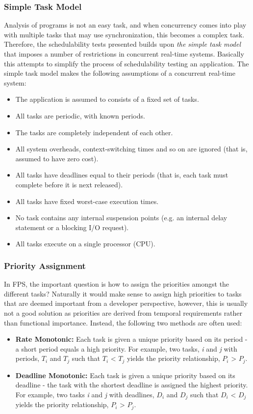\subsubsection{Simple Task Model}
Analysis of programs is not an easy task, and when concurrency comes into play with multiple tasks that may use synchronization, this becomes a complex task. Therefore, the schedulability tests presented builds upon \textit{the simple task model} that imposes a number of restrictions in concurrent real-time systems. Basically this attempts to simplify the process of schedulability testing an application. The simple task model makes the following assumptions of a concurrent real-time system:
\begin{itemize}
	\item The application is assumed to consists of a fixed set of tasks.
	\item All tasks are periodic, with known periods.
	\item The tasks are completely independent of each other.
	\item All system overheads, context-switching times and so on are ignored (that is, assumed to have zero cost).
	\item All tasks have deadlines equal to their periods (that is, each task must complete before it is next released).
	\item All tasks have fixed worst-case execution times.
	\item No task contains any internal suspension points (e.g. an internal delay statement or a blocking I/O request).
	\item All tasks execute on a single processor (CPU).
\end{itemize}

\subsubsection{Priority Assignment}
In FPS, the important question is how to assign the priorities amongst the different tasks? Naturally it would make sense to assign high priorities to tasks that are deemed important from a developer perspective, however, this is usually not a good solution as priorities are derived from temporal requirements rather than functional importance. Instead, the following two methods are often used:

\begin{itemize}
	\item \textbf{Rate Monotonic:} Each task is given a unique priority based on its period - a short period equals a high priority. For example, two tasks, \textit{i} and \textit{j} with periods, $T_i$ and $T_j$ such that $T_i$ < $T_j$ yields the priority relationship, $P_i$ > $P_j$.
	\item \textbf{Deadline Monotonic:} Each task is given a unique priority based on its deadline - the task with the shortest deadline is assigned the highest priority. For example, two tasks \textit{i} and \textit{j} with deadlines, $D_i$ and $D_j$ such that $D_i$ < $D_j$ yields the priority relationship, $P_i$ > $P_j$.
\end{itemize}

